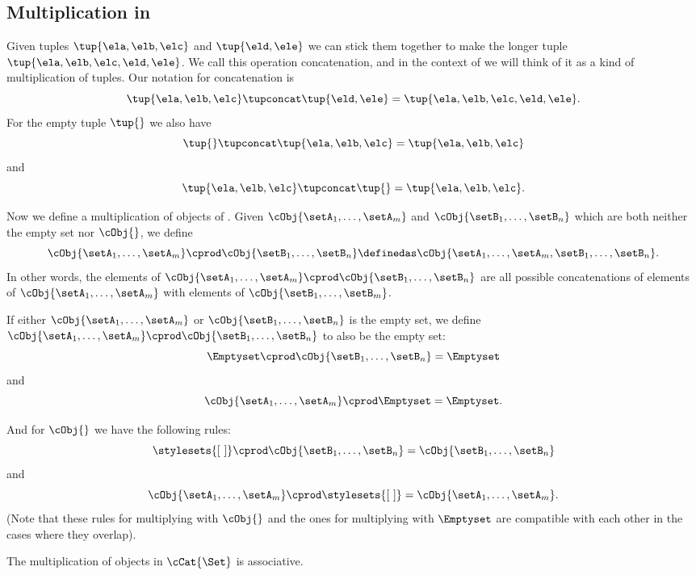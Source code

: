 \subsection{Multiplication in \cCat{\Set}}

Given tuples $\tup{\ela, \elb, \elc}$ and $\tup{\eld, \ele}$ we can stick them together to make the longer tuple$\tup{\ela, \elb, \elc, \eld, \ele}$.
We call this operation concatenation, and in the context of \cCat{\Set} we will think of it as a kind of multiplication of tuples.
Our notation for concatenation is
\begin{equation}
    \tup{\ela, \elb, \elc} \tupconcat \tup{\eld, \ele} = \tup{\ela, \elb, \elc, \eld, \ele}.
\end{equation}
For the empty tuple $\tup{  }$ we also have
\begin{equation}
    \tup{} \tupconcat \tup{\ela, \elb, \elc}  = \tup{\ela, \elb, \elc}
\end{equation}
and
\begin{equation}
    \tup{\ela, \elb, \elc}  \tupconcat \tup{ } = \tup{\ela, \elb, \elc}.
\end{equation}

Now we define a multiplication of objects of \cCat{\Set}.
Given $\cObj{\setA_1, \dots, \setA_m}$ and $\cObj{\setB_1,  \dots, \setB_n}$ which are both neither the empty set nor $\cObj{}$, we define
\begin{equation}
   \cObj{\setA_1, \dots, \setA_m} \cprod \cObj{\setB_1, \dots, \setB_n} \definedas \cObj{\setA_1, \dots, \setA_m, \setB_1,  \dots, \setB_n}.
\end{equation}
In other words, the elements of $\cObj{\setA_1, \dots, \setA_m} \cprod \cObj{\setB_1, \dots, \setB_n}$ are all possible concatenations of elements of $\cObj{\setA_1, \dots, \setA_m}$ with elements of $\cObj{\setB_1, \dots, \setB_m}$.

If either $\cObj{\setA_1, \dots, \setA_m}$ or $\cObj{\setB_1, \dots, \setB_n}$ is the empty set, we define $\cObj{\setA_1, \dots, \setA_m} \cprod \cObj{\setB_1, \dots, \setB_n}$ to also be the empty set:
\begin{equation}
    \Emptyset \cprod \cObj{\setB_1, \dots, \setB_n} = \Emptyset
\end{equation}
and
\begin{equation}
    \cObj{\setA_1, \dots, \setA_m} \cprod \Emptyset = \Emptyset.
\end{equation}

And for $\cObj{}$ we have the following rules:
\begin{equation}
    \stylesets{[ \ ]} \cprod \cObj{\setB_1, \dots, \setB_n} = \cObj{\setB_1,  \dots, \setB_n}
\end{equation}
and
\begin{equation}
    \cObj{\setA_1, \dots, \setA_m} \cprod \stylesets{[ \ ]} = \cObj{\setA_1, \dots, \setA_m}.
\end{equation}
(Note that these rules for multiplying with $\cObj{}$ and the ones for multiplying with $\Emptyset$ are compatible with each other in the cases where they overlap).

\begin{remark}
The multiplication of objects in $\cCat{\Set}$ is associative. 
\end{remark}

